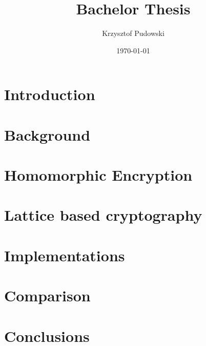 \documentclass[11pt,a4paper]{article}
\title{Bachelor Thesis}
\author{Krzysztof Pudowski}
\date{\today}
\theoremstyle{plain}
\theoremstyle{definition}
\theoremstyle{remark}
\begin{document}



\tableofcontents

\section{Introduction}


\section{Background}


\section{Homomorphic Encryption}


\section{Lattice based cryptography}


\section{Implementations}


\section{Comparison}


\section{Conclusions}


\newpage
\printbibliography
{}
\end{document}
